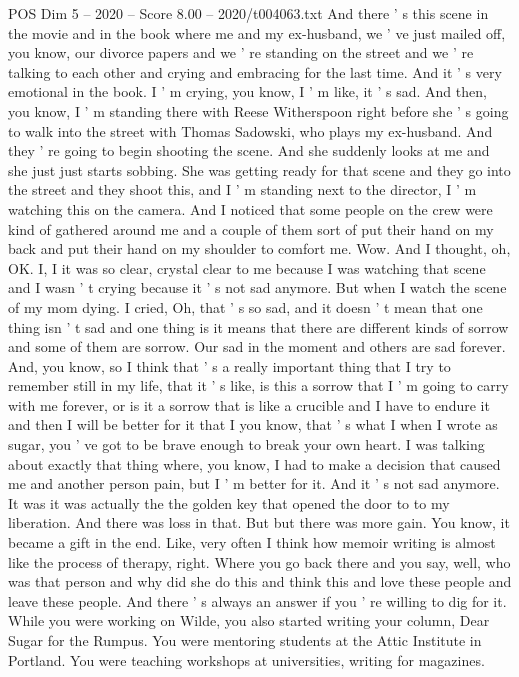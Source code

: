 \begin{textsample}{POS Dim 5 – 2020 – Score 8.00 – 2020/t004063.txt}
And there ' s this scene in the movie and in the book where me and my ex-husband, we ' ve just mailed off, you know, our divorce papers and we ' re standing on the street and we ' re talking to each other and crying and embracing for the last time.
And it ' s very emotional in the book.
I ' m crying, you know, I ' m like, it ' s sad.
And then, you know, I ' m standing there with Reese Witherspoon right before she ' s going to walk into the street with Thomas Sadowski, who plays my ex-husband.
And they ' re going to begin shooting the scene.
And she suddenly looks at me and she just just starts sobbing.
She was getting ready for that scene and they go into the street and they shoot this, and I ' m standing next to the director, I ' m watching this on the camera.
And I noticed that some people on the crew were kind of gathered around me and a couple of them sort of put their hand on my back and put their hand on my shoulder to comfort me.
Wow.
And I thought, oh, OK.
I, I it was so clear, crystal clear to me because I was watching that scene and I wasn ' t crying because it ' s not sad anymore.
But when I watch the scene of my mom dying.
I cried, Oh, that ' s so sad, and it doesn ' t mean that one thing isn ' t sad and one thing is it means that there are different kinds of sorrow and some of them are sorrow.
Our sad in the moment and others are sad forever.
And, you know, so I think that ' s a really important thing that I try to remember still in my life, that it ' s like, is this a sorrow that I ' m going to carry with me forever, or is it a sorrow that is like a crucible and I have to endure it and then I will be better for it that I you know, that ' s what I when I wrote as sugar, you ' ve got to be brave enough to break your own heart.
I was talking about exactly that thing where, you know, I had to make a decision that caused me and another person pain, but I ' m better for it.
And it ' s not sad anymore.
It was it was actually the the golden key that opened the door to to my liberation.
And there was loss in that.
But but there was more gain.
You know, it became a gift in the end.
Like, very often I think how memoir writing is almost like the process of therapy, right.
Where you go back there and you say, well, who was that person and why did she do this and think this and love these people and leave these people.
And there ' s always an answer if you ' re willing to dig for it.
While you were working on Wilde, you also started writing your column, Dear Sugar for the Rumpus.
You were mentoring students at the Attic Institute in Portland.
You were teaching workshops at universities, writing for magazines.

\end{textsample}
